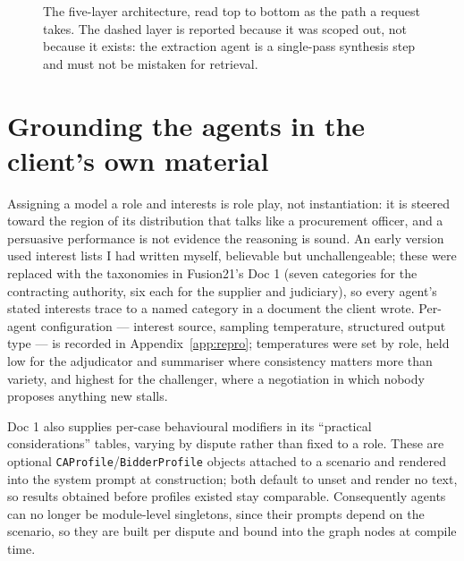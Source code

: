 \begin{figure}[htbp]
{}
\caption[System architecture]{The five-layer architecture, read top to bottom as
the path a request takes. The dashed layer is reported because it was scoped
out, not because it exists: the extraction agent is a single-pass synthesis
step and must not be mistaken for retrieval.}
\label{fig:architecture}
\end{figure}

\section{Grounding the agents in the client's own material}
\label{sec:grounding}

Assigning a model a role and interests is role play, not instantiation: it is
steered toward the region of its distribution that talks like a procurement
officer, and a persuasive performance is not evidence the reasoning is
sound. An early version used interest lists I had written myself, believable
but unchallengeable; these were replaced with the taxonomies in Fusion21's
Doc 1 (seven categories for the contracting authority, six each for the
supplier and judiciary), so every agent's stated interests trace to a named
category in a document the client wrote. Per-agent configuration ---
interest source, sampling temperature, structured output type --- is
recorded in Appendix~\ref{app:repro}; temperatures were set by role, held
low for the adjudicator and summariser where consistency matters more than
variety, and highest for the challenger, where a negotiation in which
nobody proposes anything new stalls.

Doc 1 also supplies per-case behavioural modifiers in its ``practical
considerations'' tables, varying by dispute rather than fixed to a role.
These are optional \texttt{CAProfile}/\texttt{BidderProfile} objects
attached to a scenario and rendered into the system prompt at construction;
both default to unset and render no text, so results obtained before
profiles existed stay comparable. Consequently agents can no longer be
module-level singletons, since their prompts depend on the scenario, so they
are built per dispute and bound into the graph nodes at compile time.


